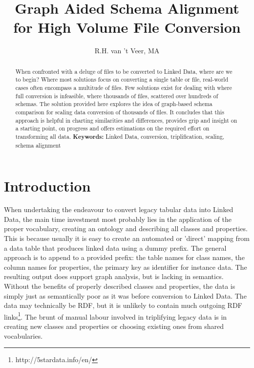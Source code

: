 \documentclass[12pt,twoside,a4paper]{article}
\begin{document}
\title{Graph Aided Schema Alignment for High Volume File Conversion}
\author{R.H. van 't Veer, MA}
\maketitle
\begin{abstract}
When confronted with a deluge of files to be converted to Linked Data, where are we to begin? Where most solutions focus on converting a single table or file, real-world cases often encompass a multitude of files. Few solutions exist for dealing with where full conversion is infeasible, where thousands of files, scattered over hundreds of schemas. The solution provided here explores the idea of graph-based schema comparison for scaling data conversion of thousands of files. It concludes that this approach is helpful in charting similarities and differences, provides grip and insight on a starting point, on progress and offers estimations on the required effort on transforming all data.
{\bf Keywords:} Linked Data, conversion, triplification, scaling, schema alignment
\end{abstract}
\section{Introduction}

When undertaking the endeavour to convert legacy tabular data into Linked Data, the main time investment most probably lies in the application of the proper vocabulary, creating an ontology and describing all classes and properties. This is because usually it is easy to create an automated or 'direct' mapping from a data table that produces linked data using a dummy prefix. The general approach is to append to a provided prefix: the table names for class names, the column names for properties, the primary key as identifier for instance data.\cite{michel:hal-00903568} The resulting output does support graph analysis, but is lacking in semantics. Without the benefits of properly described classes and properties, the data is simply just as semantically poor as it was before conversion to Linked Data. The data may technically be RDF, but it is unlikely to contain much outgoing RDF links\footnote{http://5stardata.info/en/}. The brunt of manual labour involved in triplifying legacy data is in creating new classes and properties or choosing existing ones from shared vocabularies. 
\end{document}
